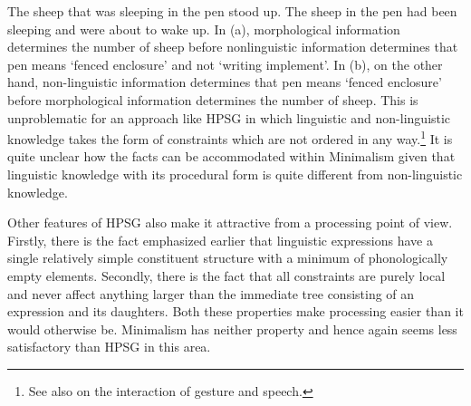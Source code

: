 \documentclass[output=paper,biblatex,babelshorthands,newtxmath,draftmode,colorlinks,citecolor=brown]{langscibook}
\begin{document}
\eal
\label{ex-sheep-pen-processing}
\ex 	The sheep that was sleeping in the pen stood up.
\ex	The sheep in the pen had been sleeping and were about to wake up.
\zl
%
In (a), morphological information determines the number of sheep before nonlinguistic
information determines that pen means ‘fenced enclosure’ and not ‘writing implement’. In (b), on
the other hand, non-linguistic information determines that pen means ‘fenced enclosure’ before
morphological information determines the number of sheep. This is unproblematic for an approach like
HPSG in which linguistic and non-linguistic knowledge takes the form of constraints which are not
ordered in any way.\footnote{%
  See also  on the interaction of gesture and speech.
}
It is quite unclear how the facts can be accommodated within Minimalism given
that linguistic knowledge with its procedural form is quite different from non-linguistic knowledge.

Other features of HPSG also make it attractive from a processing point of view. Firstly, there is
the fact emphasized earlier that linguistic expressions have a single relatively simple constituent
structure with a minimum of phonologically empty elements. Secondly, there is the fact that all
constraints are purely local and never affect anything larger than the immediate tree consisting of an
expression and its daughters. Both these properties make processing easier than it would otherwise
be. Minimalism has neither property and hence again seems less satisfactory than HPSG in this area.
\end{document}
